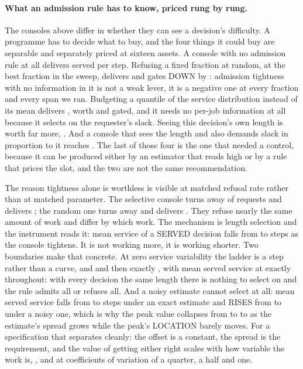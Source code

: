 \documentclass[11pt]{article}
\begin{document}
\paragraph{What an admission rule has to know, priced rung by rung.} The consoles above differ in
whether they can see a decision's difficulty. A programme has to decide what to buy, and the four
things it could buy are separable and separately priced at sixteen assets. A console with no
admission rule at all delivers \BiRungNone{} served per step. Refusing a fixed fraction at random,
at the best fraction in the sweep, delivers \BiRungRandom{} and gates DOWN by
\BiRungRandomGap{}: admission tightness with no information in it is not a weak lever, it is a
negative one at every fraction and every span we ran. Budgeting a quantile of the service
distribution instead of its mean delivers \BiRungQuantile{}, worth \BiRungQuantileGap{} and gated,
and it needs no per-job information at all because it selects on the requester's slack. Seeing this
decision's own length is worth far more, \BiRungSeeing{}. And a console that sees the length and
also demands slack in proportion to it reaches \BiRungPriced{}. The last of those four is the one
that needed a control, because it can be produced either by an estimator that reads high or by a
rule that prices the slot, and the two are not the same recommendation.

The reason tightness alone is worthless is visible at matched refusal rate rather than at matched
parameter. The selective console turns away \BiRefuseSel{} of requests and delivers
\BiMatchedSel{}; the random one turns away \BiRefuseRand{} and delivers \BiMatchedRand{}. They
refuse nearly the same amount of work and differ by which work. The mechanism is length selection
and the instrument reads it: mean service of a SERVED decision falls from \BiSvcOne{} to
\BiSvcBest{} steps as the console tightens. It is not working more, it is working shorter. Two
boundaries make that concrete. At zero service variability the ladder is a step rather than a curve,
\BiFlatOne{} and \BiFlatBest{} and then exactly \BiFlatOff{}, with mean served service at exactly
\BiFlatSvc{} throughout: with every decision the same length there is nothing to select on and the
rule admits all or refuses all. And a noisy estimate cannot select at all: mean served service falls
from \BiSelClean{} to \BiSelCleanTop{} steps under an exact estimate and RISES from
\BiSelNoisy{} to \BiSelNoisyTop{} under a noisy one, which is why the peak value collapses from
\BiPeakClean{} to \BiPeakMid{} to \BiPeakNoisy{} as the estimate's spread grows while the peak's
LOCATION barely moves. For a specification that separates cleanly: the offset is a constant, the
spread is the requirement, and the value of getting either right scales with how variable the work
is, \BiCvLow{}, \BiCvMid{} and \BiCvHigh{} at coefficients of variation of a quarter, a half and
one.
\end{document}
